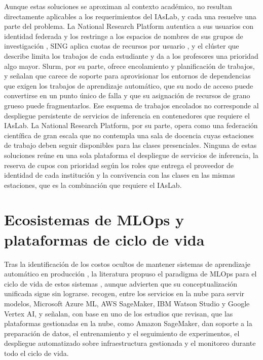 Aunque estas soluciones se aproximan al contexto académico, no resultan directamente aplicables a los requerimientos del IAsLab, y cada una resuelve una parte del problema. La National Research Platform autentica a sus usuarios con identidad federada y los restringe a los espacios de nombres de sus grupos de investigación \citep{weitzel-nrpreservation-2025}, SING aplica cuotas de recursos por usuario \citep{xu-sing-2025}, y el clúster que describe \citet{george-hpcgpuclassroom-2020} limita los trabajos de cada estudiante y da a los profesores una prioridad algo mayor. Slurm, por su parte, ofrece encolamiento y planificación de trabajos, y \citet{xu-sing-2025} señalan que carece de soporte para aprovisionar los entornos de dependencias que exigen los trabajos de aprendizaje automático, que su nodo de acceso puede convertirse en un punto único de falla y que su asignación de recursos de grano grueso puede fragmentarlos. Ese esquema de trabajos encolados no corresponde al despliegue persistente de servicios de inferencia en contenedores que requiere el IAsLab. La National Research Platform, por su parte, opera como una federación científica de gran escala que no contempla una sala de docencia cuyas estaciones de trabajo deben seguir disponibles para las clases presenciales. Ninguna de estas soluciones reúne en una sola plataforma el despliegue de servicios de inferencia, la reserva de cupos con prioridad según los roles que entrega el proveedor de identidad de cada institución y la convivencia con las clases en las mismas estaciones, que es la combinación que requiere el IAsLab.

\section{Ecosistemas de MLOps y plataformas de ciclo de vida}\label{sec:ecosistemas-mlops}

Tras la identificación de los costos ocultos de mantener sistemas de aprendizaje automático en producción \citep{sculley-hiddentechnicaldebt-2015}, la literatura propuso el paradigma de MLOps para el ciclo de vida de estos sistemas \citep{kreuzberger-mlopsoverview-2023, eken-mlopsmultivocalreview-2026}, aunque \citet{eken-mlopsmultivocalreview-2026} advierten que su conceptualización unificada sigue sin lograrse. \citet{kreuzberger-mlopsoverview-2023} recogen, entre los servicios en la nube para servir modelos, Microsoft Azure ML, AWS SageMaker, IBM Watson Studio y Google Vertex AI, y \citet{eken-mlopsmultivocalreview-2026} señalan, con base en uno de los estudios que revisan, que las plataformas gestionadas en la nube, como Amazon SageMaker, dan soporte a la preparación de datos, el entrenamiento y el seguimiento de experimentos, el despliegue automatizado sobre infraestructura gestionada y el monitoreo durante todo el ciclo de vida.

